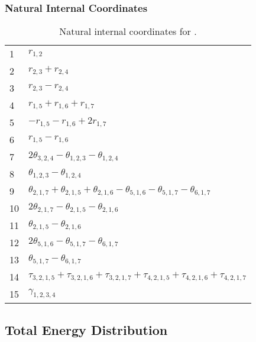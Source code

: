 \documentclass[10pt,oneside]{article}
\begin{document}
\begin{table}[h!]
\subsubsection*{Natural Internal Coordinates}
\centering
\caption{Natural internal coordinates for .}
\small
\begin{tabular}{ll}
\toprule
  1   & $r_{1,2}$ \\
  2   & $r_{2,3} + r_{2,4}$ \\
  3   & $r_{2,3} - r_{2,4}$ \\
  4   & $r_{1,5} + r_{1,6} + r_{1,7}$ \\
  5   & $-r_{1,5} - r_{1,6} + 2r_{1,7}$ \\
  6   & $r_{1,5} - r_{1,6}$ \\
  7   & $2\theta_{3,2,4} - \theta_{1,2,3} - \theta_{1,2,4}$ \\
  8   & $\theta_{1,2,3} - \theta_{1,2,4}$ \\
  9   & $\theta_{2,1,7} + \theta_{2,1,5} + \theta_{2,1,6} - \theta_{5,1,6} - \theta_{5,1,7} - \theta_{6,1,7}$ \\
  10  & $2\theta_{2,1,7} - \theta_{2,1,5} - \theta_{2,1,6}$ \\
  11  & $\theta_{2,1,5} - \theta_{2,1,6}$ \\
  12  & $2\theta_{5,1,6} - \theta_{5,1,7} - \theta_{6,1,7}$ \\
  13  & $\theta_{5,1,7} - \theta_{6,1,7}$ \\
  14  & $\tau_{3,2,1,5} + \tau_{3,2,1,6} + \tau_{3,2,1,7} + \tau_{4,2,1,5} + \tau_{4,2,1,6} + \tau_{4,2,1,7}$ \\
  15  & $\gamma_{1,2,3,4}$ \\
\bottomrule
\end{tabular}
\end{table}

\begin{table}
\subsection*{Total Energy Distribution}
\centering\end{table}

\clearpage

\subsection{}
\end{document}
